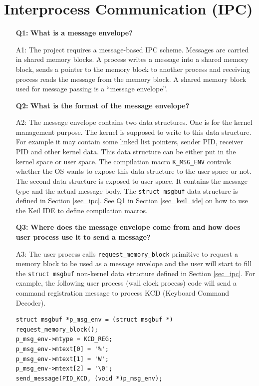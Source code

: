 \section{Interprocess Communication (IPC)}
\label{sec_ipc_faq}
\begin{itemize}
\item[{\bf Q1:}] {\bf What is a message envelope?}
\item[A1:] The project requires a message-based IPC scheme. Messages are carried in shared memory blocks. A process writes a message into a shared memory block, sends a pointer to the memory block to another process and receiving process reads the message from the memory block. A shared memory block used for message passing is a ``message envelope”. 

\item[{\bf Q2:}] {\bf What is the format of the message envelope?}
\item[A2:] The message envelope contains two data structures. One is for the kernel management purpose. The kernel is supposed to write to this data structure. For example it may contain some linked list pointers, sender PID, receiver PID and other kernel data. This data structure can be either put in the kernel space or user space. The compilation macro \verb+K_MSG_ENV+ controls whether the OS wants to expose this data structure to the user space or not. The second data structure is exposed to user space. It contains the message type and the actual message body. The \verb+struct msgbuf+ data structure is defined in Section \ref{sec_ipc}. See Q1 in Section \ref{sec_keil_ide} on how to use the Keil IDE to define compilation macros.

\item[{\bf Q3:}] {\bf Where does the message envelope come from and how does user process use it to send a message?}
\item[A3:]The user process calls \verb+request_memory_block+ primitive to request a memory block to be used as a message envelope and the user will start to fill the \verb+struct msgbuf+ non-kernel data structure defined in Section \ref{sec_ipc}.
For example, the following user process (wall clock process) code will send a command registration message to process KCD (Keyboard Command Decoder).
\begin{lstlisting}
struct msgbuf *p_msg_env = (struct msgbuf *) request_memory_block();
p_msg_env->mtype = KCD_REG;
p_msg_env->mtext[0] = '%';
p_msg_env->mtext[1] = 'W';
p_msg_env->mtext[2] = '\0';
send_message(PID_KCD, (void *)p_msg_env);
\end{lstlisting}


\end{itemize}
